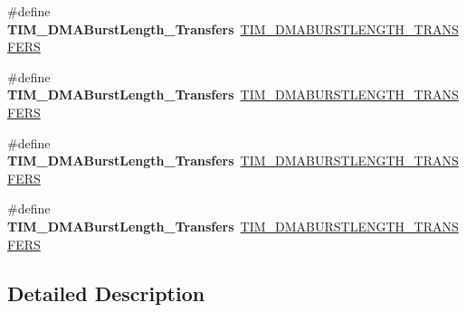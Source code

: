\begin{DoxyCompactItemize}
\item 
\mbox{\label{group___h_a_l___t_i_m___aliased___defines_gad13373f5fd246557a4fc487dc43c37ec}} 
\#define {\bfseries T\+I\+M\+\_\+\+D\+M\+A\+Burst\+Length\+\_\+Transfers}~\mbox{\hyperlink{group___t_i_m___d_m_a___burst___length_ga98a4d88c533178bc1b4347e4c5ce815a}{T\+I\+M\+\_\+\+D\+M\+A\+B\+U\+R\+S\+T\+L\+E\+N\+G\+T\+H\+\_\+T\+R\+A\+N\+S\+F\+E\+RS}}
\item 
\mbox{\label{group___h_a_l___t_i_m___aliased___defines_gafb644e6033f7b46c602b02754b69fde0}} 
\#define {\bfseries T\+I\+M\+\_\+\+D\+M\+A\+Burst\+Length\+\_\+Transfers}~\mbox{\hyperlink{group___t_i_m___d_m_a___burst___length_gaf4b2a1fe12c52272544c21e17de1ed90}{T\+I\+M\+\_\+\+D\+M\+A\+B\+U\+R\+S\+T\+L\+E\+N\+G\+T\+H\+\_\+T\+R\+A\+N\+S\+F\+E\+RS}}
\item 
\mbox{\label{group___h_a_l___t_i_m___aliased___defines_ga5b2c97f650a3c1726965187d852b8cc5}} 
\#define {\bfseries T\+I\+M\+\_\+\+D\+M\+A\+Burst\+Length\+\_\+Transfers}~\mbox{\hyperlink{group___t_i_m___d_m_a___burst___length_gad31c1fca7ed436a53efc4f290144584d}{T\+I\+M\+\_\+\+D\+M\+A\+B\+U\+R\+S\+T\+L\+E\+N\+G\+T\+H\+\_\+T\+R\+A\+N\+S\+F\+E\+RS}}
\item 
\mbox{\label{group___h_a_l___t_i_m___aliased___defines_gaed9f2afef174079f6eb6927abd995b9b}} 
\#define {\bfseries T\+I\+M\+\_\+\+D\+M\+A\+Burst\+Length\+\_\+Transfers}~\mbox{\hyperlink{group___t_i_m___d_m_a___burst___length_gabb6f72b02ee1c8855de241cb0713e2ca}{T\+I\+M\+\_\+\+D\+M\+A\+B\+U\+R\+S\+T\+L\+E\+N\+G\+T\+H\+\_\+T\+R\+A\+N\+S\+F\+E\+RS}}
\end{DoxyCompactItemize}


\subsection{Detailed Description}

